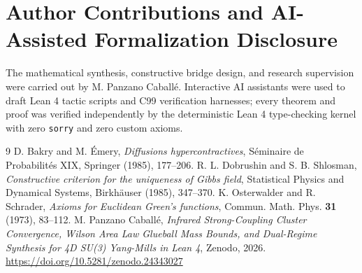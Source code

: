 \documentclass[11pt,a4paper]{article}
\begin{document}
\section*{Author Contributions and AI-Assisted Formalization Disclosure}
The mathematical synthesis, constructive bridge design, and research supervision were carried out by M. Panzano Caball\'e. Interactive AI assistants were used to draft Lean 4 tactic scripts and C99 verification harnesses; every theorem and proof was verified independently by the deterministic Lean 4 type-checking kernel with zero \texttt{sorry} and zero custom axioms.

\begin{thebibliography}{9}
 D. Bakry and M. \'Emery, \emph{Diffusions hypercontractives}, S\'eminaire de Probabilit\'es XIX, Springer (1985), 177--206.
 R. L. Dobrushin and S. B. Shlosman, \emph{Constructive criterion for the uniqueness of Gibbs field}, Statistical Physics and Dynamical Systems, Birkh\"auser (1985), 347--370.
 K. Osterwalder and R. Schrader, \emph{Axioms for Euclidean Green's functions}, Commun. Math. Phys. \textbf{31} (1973), 83--112.
 M. Panzano Caball\'e, \emph{Infrared Strong-Coupling Cluster Convergence, Wilson Area Law Glueball Mass Bounds, and Dual-Regime Synthesis for 4D SU(3) Yang-Mills in Lean 4}, Zenodo, 2026. \url{https://doi.org/10.5281/zenodo.24343027}
\end{thebibliography}
\end{document}

